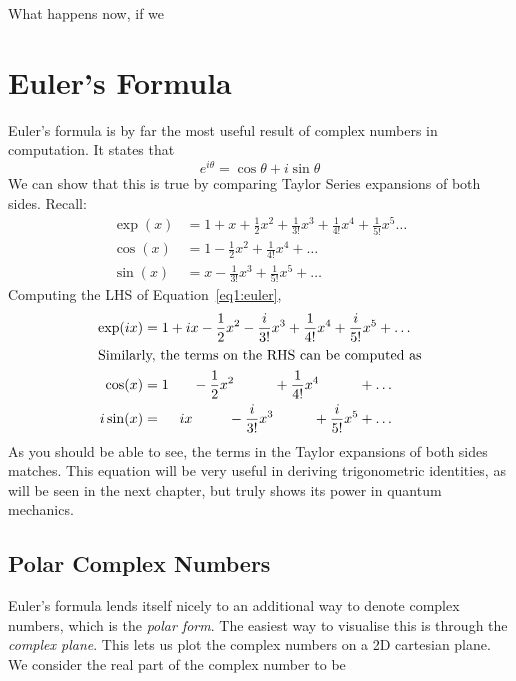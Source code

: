 What happens now, if we
\section{Euler's Formula}
Euler's formula is by far the most useful result of complex numbers in computation. It states that
\begin{equation}
	e^{i\theta} = \cos\theta + i\sin\theta \label{eq1:euler}
\end{equation}
We can show that this is true by comparing Taylor Series expansions of both sides. Recall:
\begin{align*}
	\exp(x) &= 1 + x + \frac{1}{2}x^2 + \frac{1}{3!} x^3+\frac{1}{4!}x^4+\frac{1}{5!}x^5\dots\\
	\cos(x) &= 1 - \frac{1}{2}x^2 + \frac{1}{4!}x^4+\dots\\
	\sin(x) &= x - \frac{1}{3!}x^3+\frac{1}{5!}x^5+\dots
\end{align*}
Computing the LHS of Equation~\ref{eq1:euler},
\begin{align*}
	\exp(ix) &= 1 + ix -\frac{1}{2}x^2 - \frac{i}{3!} x^3 + \frac{1}{4!}x^4 + \frac{i}{5!}x^5+\dots\\
	\intertext{Similarly, the terms on the RHS can be computed as}
	\cos(x)&=1\hphantom{+ix}-\frac{1}{2}x^2\hphantom{-\frac{i}{3!}x^3}+\frac{1}{4!}x^4\hphantom{+\frac{i}{5!}x^5}+\dots\\
	i\sin(x)&=\hphantom{1+}ix\hphantom{-\frac{1}{2}x^2}-\frac{i}{3!}x^3\hphantom{+\frac{1}{4!}x^4}+\frac{i}{5!}x^5+\dots
\end{align*}
As you should be able to see, the terms in the Taylor expansions of both sides matches. This equation will be very useful in deriving trigonometric identities, as will be seen in the next chapter, but truly shows its power in quantum mechanics.

\subsection{Polar Complex Numbers}
Euler's formula lends itself nicely to an additional way to denote complex numbers, which is the \emph{polar form}. The easiest way to visualise this is through the \emph{complex plane}. This lets us plot the complex numbers on a 2D cartesian plane. We consider the real part of the complex number to be 


